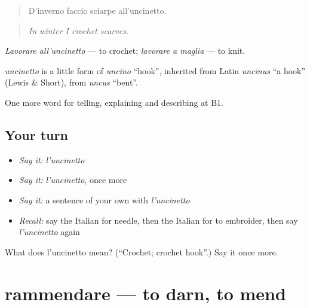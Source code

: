 \begin{quote}
D'inverno faccio sciarpe all'uncinetto.
\end{quote}

\begin{quote}
\emph{In winter I crochet scarves.}
\end{quote}

\emph{Lavorare all'uncinetto} — to crochet; \emph{lavorare a maglia} — to knit.

\begin{cousinweb}
\emph{uncinetto} is a little form of \emph{uncino} \textquotedblleft{}hook\textquotedblright{}, inherited from Latin \emph{uncīnus} \textquotedblleft{}a hook\textquotedblright{} (Lewis \& Short), from \emph{uncus} \textquotedblleft{}bent\textquotedblright{}.
\end{cousinweb}

\begin{grammarlens}[title={What you've built}]
One more word for telling, explaining and describing at B1.
\end{grammarlens}

\subsection*{Your turn}
\begin{itemize}
\raggedright
  \item \emph{Say it:} \emph{l'uncinetto}
  \item \emph{Say it:} \emph{l'uncinetto}, once more
  \item \emph{Say it:} a sentence of your own with \emph{l'uncinetto}
  \item \emph{Recall:} say the Italian for needle, then the Italian for to embroider, then say \emph{l'uncinetto} again
\end{itemize}

\begin{tcolorbox}[breakable,colback=teal!4,colframe=teal!35!black,title={Before you move on}]
What does l'uncinetto mean? (\textquotedblleft{}Crochet; crochet hook\textquotedblright{}.) Say it once more.
\end{tcolorbox}
\section[rammendare]{rammendare — to darn, to mend}

\label{lesson:IT-C500-rammendare}




